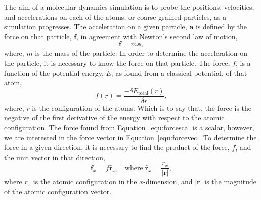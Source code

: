The aim of a molecular dynamics simulation is to probe the positions, velocities, and accelerations on each of the atoms, or coarse-grained particles, as a simulation progresses.
The acceleration on a given particle, $\mathbf{a}$ is defined by the force on that particle, $\mathbf{f}$, in agreement with Newton's second law of motion,
%
\begin{equation}
\mathbf{f} = m\mathbf{a},
\label{equ:forcevec}
\end{equation}
%
where, $m$ is the mass of the particle.
In order to determine the acceleration on the particle, it is necessary to know the force on that particle.
The force, $f$, is a function of the potential energy, $E$, as found from a classical potential, of that atom,
%
\begin{equation}
f(r) = \frac{-\delta E_{\text{total}}(r)}{\delta r},
\label{equ:forcesca}
\end{equation}
%
where, $r$ is the configuration of the atoms.
Which is to say that, the force is the negative of the first derivative of the energy with respect to the atomic configuration.
The force found from Equation~\ref{equ:forcesca} is a scalar, however, we are interested in the force vector in Equation~\ref{equ:forcevec}.
To determine the force in a given direction, it is necessary to find the product of the force, $f$, and the unit vector in that direction,
%
\begin{equation}
\mathbf{f}_x = f\hat{\mathbf{r}}_x, \;\;\;\text{where}\;\hat{\mathbf{r}}_x = \frac{r_x}{|\mathbf{r}|},
\end{equation}
%
where $r_x$ is the atomic configuration in the $x$-dimension, and $|\mathbf{r}|$ is the magnitude of the atomic configuration vector.

